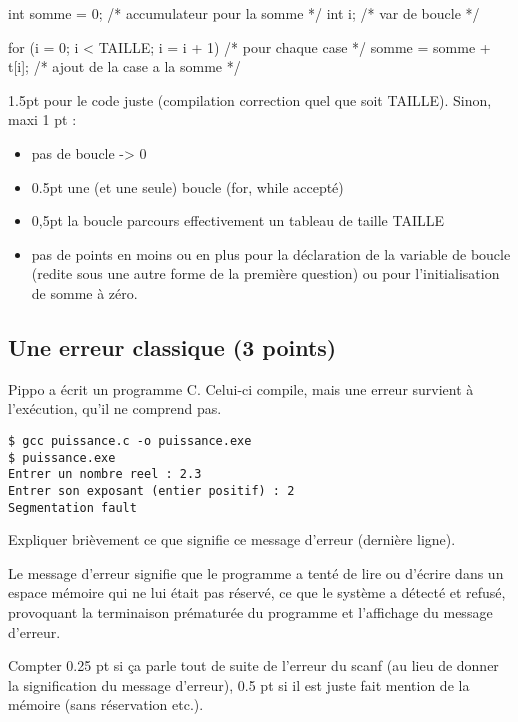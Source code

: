 \begin{correction}

  \begin{listing}{11}
  int somme = 0; /* accumulateur pour la somme */    
  int i; /* var de boucle */

  for (i = 0; i < TAILLE; i = i + 1) /* pour chaque case */
  {
    somme = somme + t[i]; /* ajout de la case a la somme */   
  }
  \end{listing}

  \begin{baremeenv}
    1.5pt pour le code juste (compilation correction quel que soit
  TAILLE). Sinon, maxi 1 pt :
  \begin{itemize}
  \item pas de boucle -> 0
  \item 0.5pt une (et une seule) boucle (for, while accepté)
  \item 0,5pt la boucle parcours effectivement un tableau de taille TAILLE
  \item pas de points en moins ou en plus pour la déclaration de la
    variable de boucle (redite sous une autre forme de la première
    question) ou pour l'initialisation de somme à zéro.
  \end{itemize}
  \end{baremeenv}
\end{correction}

\subsection{Une erreur classique (3 points)} 

Pippo a écrit un programme C. Celui-ci compile, mais une erreur survient à l'exécution, qu'il ne comprend pas.

\begin{verbatim}
$ gcc puissance.c -o puissance.exe
$ puissance.exe
Entrer un nombre reel : 2.3
Entrer son exposant (entier positif) : 2
Segmentation fault
\end{verbatim}
\question
Expliquer brièvement ce que signifie ce message d'erreur (dernière ligne).
\begin{correction}
Le message d'erreur  signifie que le programme a tenté de lire ou d'écrire dans un espace mémoire qui ne lui était pas réservé, ce que le système a détecté et refusé, provoquant la terminaison prématurée du programme et l'affichage du message d'erreur. 

\begin{baremeenv}
  Compter 0.25 pt si ça parle tout de suite de l'erreur du scanf (au lieu de donner la signification du message d'erreur), 0.5 pt si il est juste fait mention de la mémoire (sans réservation etc.).
\end{baremeenv}
\end{correction}

